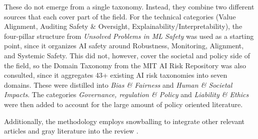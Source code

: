\begin{reviewed}
\begin{toreview}
	These do not emerge from a single taxonomy. Instead, they combine two different sources that each cover part of the field. For the technical categories (Value Alignment, Auditing Safety \& Oversight, Explainability/Interpretability), the four-pillar structure from \textit{Unsolved Problems in ML Safety} \cite{hendrycks2021unsolved} was used as a starting point, since it organizes AI safety around Robustness, Monitoring, Alignment, and Systemic Safety. This did not, however, cover the societal and policy side of the field, so the Domain Taxonomy from the MIT AI Risk Repository \cite{Slattery_2026} was also consulted, since it aggregates 43+ existing AI risk taxonomies into seven domains. These were distilled into \textit{Bias \& Fairness} and \textit{Human \& Societal Impacts}. The categories \textit{Governance, regulation \& Policy} and \textit{Liability \& Ethics} were then added to account for the large amount of policy oriented literature.

\end{toreview}

	Additionally, the methodology employs snowballing to integrate other relevant articles and gray literature into the review \cite{wohlin_guidelines_2014}.

\end{reviewed}

